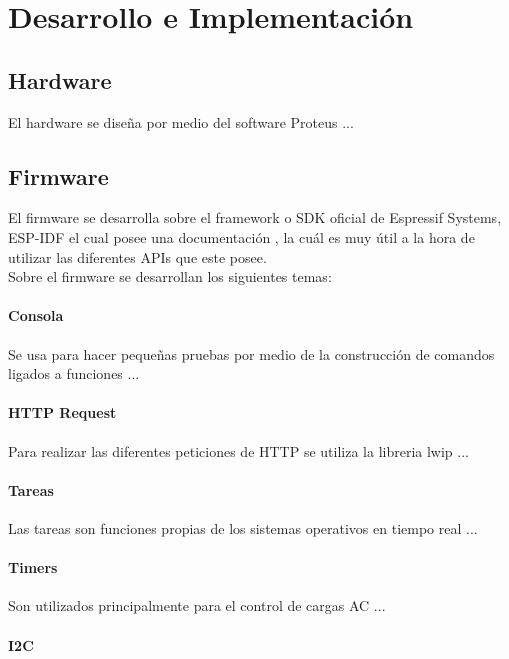 \chapter{Desarrollo e Implementación}

\section{Hardware}

El hardware se diseña por medio del software Proteus ...

\section{Firmware}

El firmware se desarrolla sobre el framework o SDK oficial de Espressif Systems, ESP-IDF el cual posee una documentación \cite{ES}, la cuál es muy útil a la hora de utilizar las diferentes APIs que este posee.\\

Sobre el firmware se desarrollan los siguientes temas:

\subsubsection{Consola}

Se usa para hacer pequeñas pruebas por medio de la construcción de comandos ligados a funciones ...

\subsubsection{HTTP Request}

Para realizar las diferentes peticiones de HTTP se utiliza la libreria lwip ...

\subsubsection{Tareas}

Las tareas son funciones propias de los sistemas operativos en tiempo real ...

\subsubsection{Timers}

Son utilizados principalmente para el control de cargas AC ...

\subsubsection{I2C}

